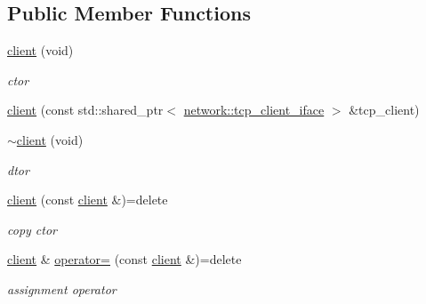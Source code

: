 \subsection*{Public Member Functions}
\begin{DoxyCompactItemize}
\item 
\mbox{\label{classcpp__redis_1_1client_a80354f41d084dfc3a41df581c803b792}} 
\hyperlink{classcpp__redis_1_1client_a80354f41d084dfc3a41df581c803b792}{client} (void)
\begin{DoxyCompactList}\small\item\em ctor \end{DoxyCompactList}\item 
\hyperlink{classcpp__redis_1_1client_ae879c3a6829a2da9d03f80c1ec4b8d9b}{client} (const std\+::shared\+\_\+ptr$<$ \hyperlink{classcpp__redis_1_1network_1_1tcp__client__iface}{network\+::tcp\+\_\+client\+\_\+iface} $>$ \&tcp\+\_\+client)
\item 
\mbox{\label{classcpp__redis_1_1client_aca7030c8bd6856f10314b2862d1bae79}} 
\hyperlink{classcpp__redis_1_1client_aca7030c8bd6856f10314b2862d1bae79}{$\sim$client} (void)
\begin{DoxyCompactList}\small\item\em dtor \end{DoxyCompactList}\item 
\mbox{\label{classcpp__redis_1_1client_ab938aeb2a144629fd269594e4af08168}} 
\hyperlink{classcpp__redis_1_1client_ab938aeb2a144629fd269594e4af08168}{client} (const \hyperlink{classcpp__redis_1_1client}{client} \&)=delete
\begin{DoxyCompactList}\small\item\em copy ctor \end{DoxyCompactList}\item 
\mbox{\label{classcpp__redis_1_1client_afdab99b1752e759ab3ce9477f2cb092d}} 
\hyperlink{classcpp__redis_1_1client}{client} \& \hyperlink{classcpp__redis_1_1client_afdab99b1752e759ab3ce9477f2cb092d}{operator=} (const \hyperlink{classcpp__redis_1_1client}{client} \&)=delete
\begin{DoxyCompactList}\small\item\em assignment operator \end{DoxyCompactList}\item 

\end{DoxyCompactItemize}
